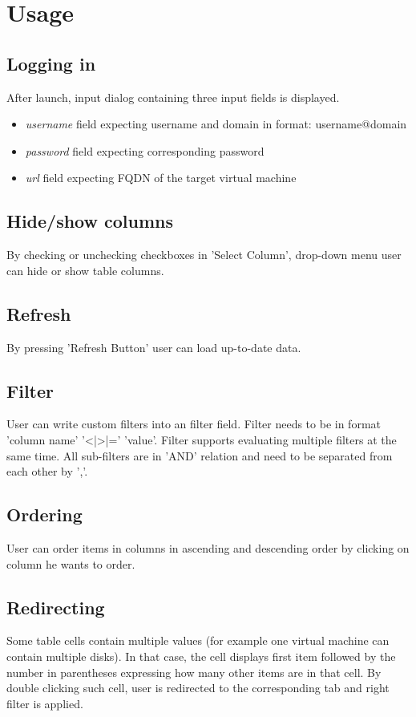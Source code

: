 \section{Usage}
\subsection{Logging in}
After launch, input dialog containing three input fields is displayed.
\begin{itemize}
\item \emph{username} field expecting username and domain in format: username@domain
\item \emph{password} field expecting corresponding password
\item \emph{url} field expecting FQDN of the target virtual machine
\end{itemize}

\subsection{Hide/show columns}
By checking or unchecking checkboxes in 'Select Column', drop-down menu user can hide or show table columns.

\subsection{Refresh}
By pressing 'Refresh Button' user can load up-to-date data.

\subsection{Filter}
User can write custom filters into an filter field. Filter needs to be in format 'column name' '<|>|=' 'value'. Filter supports evaluating multiple filters at the same time. All sub-filters are in 'AND' relation and need to be separated from each other by ','.

\subsection{Ordering}
User can order items in columns in ascending and descending order by clicking on column he wants to order.

\subsection{Redirecting}
Some table cells contain multiple values (for example one virtual machine can contain multiple disks). In that case, the cell displays first item followed by the number in parentheses expressing how many other items are in that cell. By double clicking such cell, user is redirected to the corresponding tab and right filter is applied.

